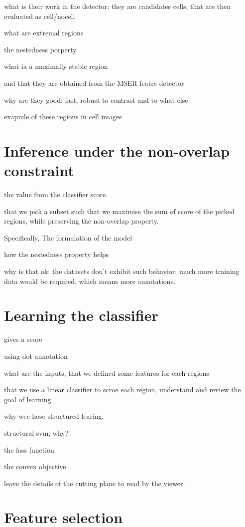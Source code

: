 	what is their work in the detector: they are candidates cells, that are then evaluated as cell/nocell	
	
	what are extremal regions
	
	the nestedness porperty
			
	what ia a maximally stable region
	
	and that they are obtained from the MSER featre detector
	
	why are they good: fast, robust to contrast and to what else
		
	exapmle of these regions in cell images
	
	\section{Inference under the non-overlap constraint \statusnew}
	\label{sec:detector_inference}
	
	the value from the classifier score. 
	
	that we pick a subset such that we maximise the sum of score of the picked regions, while preserving the non-overlap property.
	
	Specifically, The formulation of the model
	
	how the nestedness property helps
	
	why is that ok: the datasets don't exhibit such behavior. much more training data would be required, which means more annotations.
	
	\section{Learning the classifier}
	\label{sec:detector_classifier}
	
	gives a score 
	
	using dot annotation
	
	what are the inputs, that we defined some features for each regions
	
	that we use a linear classifier to scroe each region, understand and review the goal of learning
	
	why wec hose structured learing.
	
	structural svm, why?
	
	the loss function
	
	the convex objective
	
	leave the details of the cutting plane to read by the viewer.
		
	\section{Feature selection }
	\label{sec:detector_feature}
	
